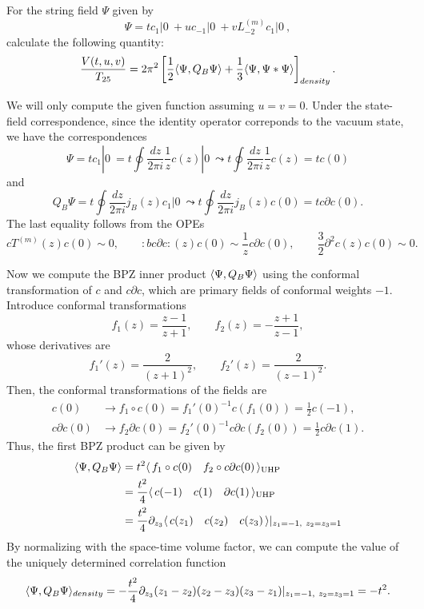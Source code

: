 \documentclass{../../../small}
\begin{document}
\begin{prb}
For the string field $\Psi$ given by
\[\Psi=tc_1|0\>+uc_{-1}|0\>+vL_{-2}^{(m)}c_1|0\>,\]
calculate the following quantity:
\[\frac{V(t,u,v)}{T_{25}}=2\pi^2\left[\frac12\langle\Psi,Q_B\Psi\rangle+\frac13\langle\Psi,\Psi*\Psi\rangle\right]_{density}.\]
\end{prb}
\begin{sol}
We will only compute the given function assuming
$u=v=0$.
Under the state-field correspondence, since the identity operator correponds to the vacuum state, we have the correspondences
\[\Psi=tc_1|0\>=t\oint\frac{dz}{2\pi i}\frac1zc(z)|0\>\leadsto t\oint\frac{dz}{2\pi i}\frac1zc(z)=tc(0)\]
and
\[Q_B\Psi=t\oint\frac{dz}{2\pi i}j_B(z)c_1|0\>\leadsto t\oint\frac{dz}{2\pi i}j_B(z)c(0)=tc\partial c(0).\]
The last equality follows from the OPEs
\[cT^{(m)}(z)c(0)\sim0,\qquad:bc\partial c:(z)c(0)\sim\frac1zc\partial c(0),\qquad\frac32\partial^2c(z)c(0)\sim0.\]

Now we compute the BPZ inner product $\langle\Psi,Q_B\Psi\rangle$ using the conformal transformation of $c$ and $c\partial c$, which are primary fields of conformal weights $-1$.
Introduce conformal transformations
\[f_1(z)=\frac{z-1}{z+1},\qquad f_2(z)=-\frac{z+1}{z-1},\]
whose derivatives are
\[f_1'(z)=\frac2{(z+1)^2},\qquad f_2'(z)=\frac2{(z-1)^2}.\]
Then, the conformal transformations of the fields are
\begin{align*}
c(0)&\to f_1\circ c(0)=f_1'(0)^{-1}c(f_1(0))=\frac12c(-1),\\
c\partial c(0)&\to f_2\partial c(0)=f_2'(0)^{-1}c\partial c(f_2(0))=\frac12c\partial c(1).
\end{align*}
Thus, the first BPZ product can be given by
\begin{align*}
\langle\Psi,Q_B\Psi\rangle
&=t^2\langle\,f_1\circ c(0)\quad f_2\circ c\partial c(0)\,\rangle_{\mathrm{UHP}}\\
&=\frac{t^2}4\langle\,c(-1)\quad c(1)\quad\partial c(1)\,\rangle_{\mathrm{UHP}}\\
&=\frac{t^2}4\partial_{z_3}\langle\,c(z_1)\quad c(z_2)\quad c(z_3)\,\rangle|_{z_1=-1,\ z_2=z_3=1}
\end{align*}
By normalizing with the space-time volume factor, we can compute the value of the uniquely determined correlation function
\[\<\Psi,Q_B\Psi\>_{density}=-\frac{t^2}4\partial_{z_3}(z_1-z_2)(z_2-z_3)(z_3-z_1)|_{z_1=-1,\ z_2=z_3=1}=-t^2.\]


\end{sol}
\end{document}
